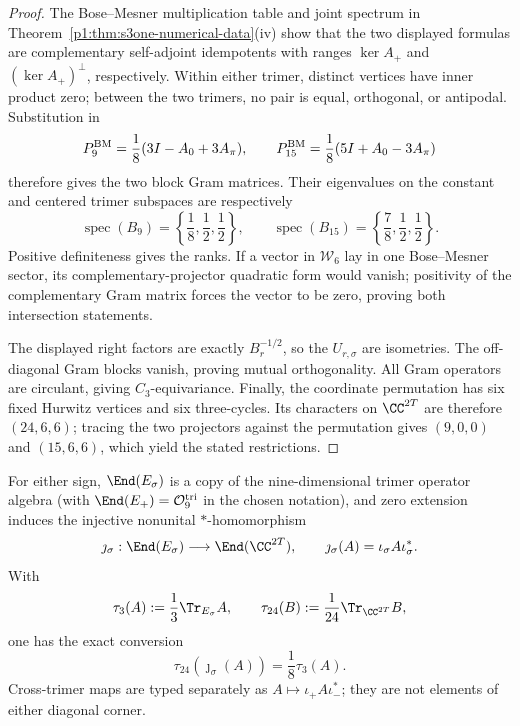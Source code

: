 \documentclass[11pt]{article}
\begin{document}
\begin{proof}
The Bose--Mesner multiplication table and joint spectrum in
Theorem~\ref{p1:thm:s3one-numerical-data}\textup{(iv)} show that the two
displayed formulas are complementary self-adjoint idempotents with ranges
\(\ker A_+\) and \((\ker A_+)^\perp\), respectively.
Within either trimer, distinct vertices have inner product zero; between the
two trimers, no pair is equal, orthogonal, or antipodal.  Substitution in
\[
 P_9^{\rm BM}=\frac18(3I-A_0+3A_\pi),
 \qquad
 P_{15}^{\rm BM}=\frac18(5I+A_0-3A_\pi)
\]
therefore gives the two block Gram matrices.  Their eigenvalues on the
constant and centered trimer subspaces are respectively
\[
 \operatorname{spec}(B_9)=\left\{\frac18,\frac12,\frac12\right\},
 \qquad
 \operatorname{spec}(B_{15})
 =\left\{\frac78,\frac12,\frac12\right\}.
\]
Positive definiteness gives the ranks.  If a vector in \(\mathcal W_6\) lay
in one Bose--Mesner sector, its complementary-projector quadratic form would
vanish; positivity of the complementary Gram matrix forces the vector to be
zero, proving both intersection statements.

The displayed right factors are exactly \(B_r^{-1/2}\), so the \(U_{r,\sigma}\)
are isometries.  The off-diagonal Gram blocks vanish, proving mutual
orthogonality.  All Gram operators are circulant, giving \(C_3\)-equivariance.
Finally, the coordinate permutation has six fixed Hurwitz vertices and six
three-cycles.  Its characters on \(\CC^{2T}\) are therefore \((24,6,6)\);
tracing the two projectors against the permutation gives \((9,0,0)\) and
\((15,6,6)\), which yield the stated restrictions.
\end{proof}

\begin{corollary}
\label{p1:cor:s3one-trimer-operator-corner}
For either sign, \(\End(E_\sigma)\) is a copy of the nine-dimensional
trimer operator algebra (with \(\End(E_+)=\mathcal O_9^{\rm tri}\) in the
chosen notation), and zero extension induces the injective nonunital
\(*\)-homomorphism
\[
 \jmath_\sigma:\End(E_\sigma)
 \longrightarrow\End(\CC^{2T}),
 \qquad
 \jmath_\sigma(A)=\iota_\sigma A\iota_\sigma^*.
\]
With
\[
 \tau_3(A):=\frac13\Tr_{E_\sigma}A,
 \qquad
 \tau_{24}(B):=\frac1{24}\Tr_{\CC^{2T}}B,
\]
one has the exact conversion
\[
 \tau_{24}(\jmath_\sigma(A))=\frac18\tau_3(A).
\]
Cross-trimer maps are typed separately as
\(A\mapsto\iota_+A\iota_-^*\); they are not elements of either diagonal
corner.
\end{corollary}
\end{document}
